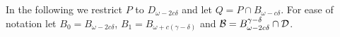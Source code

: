 
In the following we restrict $P$ to $D_{\omega-2c\delta}$ and let $Q = P\cap B_{\omega - c\delta}$.
For ease of notation let $B_0 = B_{\omega - 2c\delta}$, $B_1 = B_{\omega + c(\gamma-\delta)}$ and ${\mathcal{B}} = B_{\omega-2c\delta}^{\gamma-\delta}\cap{\mathcal{D}}$.

